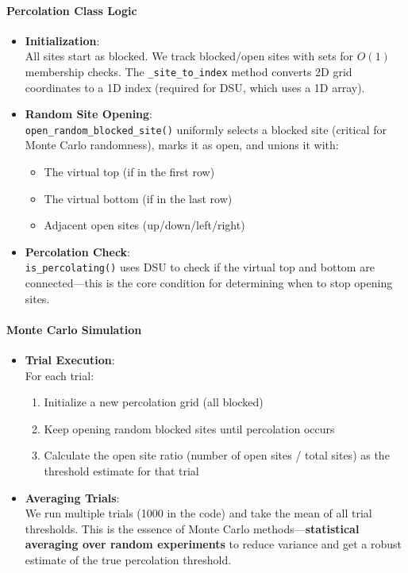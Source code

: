\documentclass[11pt]{article}
\providecommand{\tightlist}{%
      \setlength{\itemsep}{0pt}\setlength{\parskip}{0pt}}
\begin{document}
\paragraph{Percolation Class Logic}\label{percolation-class-logic}

\begin{itemize}
\item
  \textbf{Initialization}:\\
  All sites start as blocked. We track blocked/open sites with sets for
  \(O(1)\) membership checks. The \texttt{\_site\_to\_index} method
  converts 2D grid coordinates to a 1D index (required for DSU, which
  uses a 1D array).
\item
  \textbf{Random Site Opening}:\\
  \texttt{open\_random\_blocked\_site()} uniformly selects a blocked
  site (critical for Monte Carlo randomness), marks it as open, and
  unions it with:

  \begin{itemize}
  \tightlist
  \item
    The virtual top (if in the first row)
  \item
    The virtual bottom (if in the last row)
  \item
    Adjacent open sites (up/down/left/right)
  \end{itemize}
\item
  \textbf{Percolation Check}:\\
  \texttt{is\_percolating()} uses DSU to check if the virtual top and
  bottom are connected---this is the core condition for determining when
  to stop opening sites.
\end{itemize}

\paragraph{Monte Carlo Simulation}\label{monte-carlo-simulation}

\begin{itemize}
\tightlist
\item
  \textbf{Trial Execution}:\\
  For each trial:

  \begin{enumerate}
  \def\labelenumi{\arabic{enumi}.}
  \tightlist
  \item
    Initialize a new percolation grid (all blocked)
  \item
    Keep opening random blocked sites until percolation occurs
  \item
    Calculate the open site ratio (number of open sites / total sites)
    as the threshold estimate for that trial
  \end{enumerate}
\item
  \textbf{Averaging Trials}:\\
  We run multiple trials (1000 in the code) and take the mean of all
  trial thresholds. This is the essence of Monte Carlo
  methods---\textbf{statistical averaging over random experiments} to
  reduce variance and get a robust estimate of the true percolation
  threshold.
\end{itemize}
\end{document}
